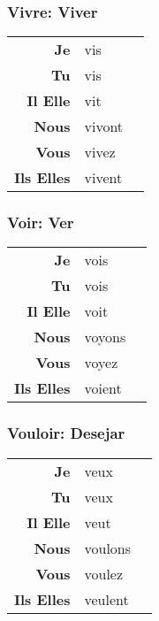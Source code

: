 \documentclass{subfiles}
\begin{document}
\begin{multicols}{3}
        \subsubsection{Vivre: Viver}
            \begin{tabular}{r l r}
                \textbf{Je}        & vis    &\\
                \textbf{Tu}        & vis    &\\
                \textbf{Il Elle}   & vit    &\\
                \textbf{Nous}      & vivont &\\
                \textbf{Vous}      & vivez  &\\
                \textbf{Ils Elles} & vivent &
            \end{tabular} 

        \subsubsection{Voir: Ver}
            \begin{tabular}{r l r}
                \textbf{Je}        & vois   &\\
                \textbf{Tu}        & vois   &\\
                \textbf{Il Elle}   & voit   &\\
                \textbf{Nous}      & voyons &\\
                \textbf{Vous}      & voyez  &\\
                \textbf{Ils Elles} & voient &
            \end{tabular}

        \subsubsection{Vouloir: Desejar}
            \begin{tabular}{r l r}
                \textbf{Je}        & veux    &\\
                \textbf{Tu}        & veux    &\\
                \textbf{Il Elle}   & veut    &\\
                \textbf{Nous}      & voulons &\\
                \textbf{Vous}      & voulez  &\\
                \textbf{Ils Elles} & veulent &
            \end{tabular}


\end{multicols}
\end{document}
